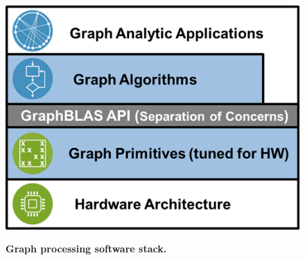 \begin{figure}[t]
\includegraphics[width=\linewidth]{gbtl}
\label{fig:gbtl}
\caption
{\textbf{Graph processing software stack.}}
\end{figure}
%
%


